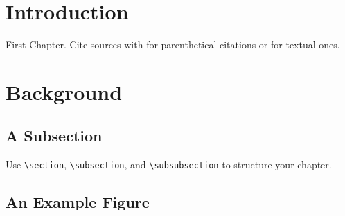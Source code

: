 \section{Introduction}
First Chapter. Cite sources with \citep{example-key}
for parenthetical citations or \citet{example-key} for textual ones.

\section{Background}
\subsection{A Subsection}
Use \texttt{\textbackslash section}, \texttt{\textbackslash subsection}, and
\texttt{\textbackslash subsubsection} to structure your chapter.

\subsection{An Example Figure}
